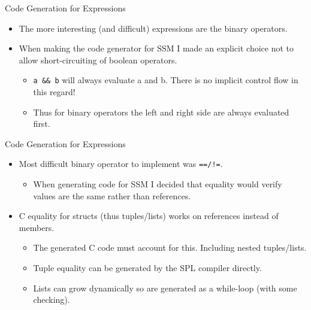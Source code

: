 \documentclass[10pt]{beamer}
\begin{document}
\begin{frame}{Code Generation for Expressions}
    \begin{itemize}
        \item The more interesting (and difficult) expressions are the binary operators.
        \item When making the code generator for SSM I made an explicit choice not to allow short-circuiting of boolean operators.
        \begin{itemize}
            \item \texttt{a \&\& b} will always evaluate a and b. There is no implicit control flow in this regard!
            \item Thus for binary operators the left and right side are always evaluated first.
        \end{itemize}
    \end{itemize}
\end{frame}

\begin{frame}{Code Generation for Expressions}
    \begin{itemize}
        \item Most difficult binary operator to implement was \texttt{==/!=}.
        \begin{itemize}
            \item When generating code for SSM I decided that equality would verify values are the same rather than references.
        \end{itemize}
        \item C equality for structs (thus tuples/lists) works on references instead of members.
        \begin{itemize}
            \item The generated C code must account for this. Including nested tuples/lists.
            \item Tuple equality can be generated by the SPL compiler directly.
            \item Lists can grow dynamically so are generated as a while-loop (with some checking).
        \end{itemize}
    \end{itemize}
\end{frame}
\end{document}
